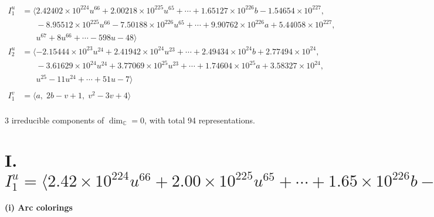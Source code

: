 \documentclass[1p]{elsarticle_modified}
\theoremstyle{definition}
\begin{document}
\begin{align*}
I^u_{1}&=\langle 
2.42402\times10^{224} u^{66}+2.00218\times10^{225} u^{65}+\cdots+1.65127\times10^{226} b-1.54654\times10^{227},\\
\phantom{I^u_{1}}&\phantom{= \langle  }-8.95512\times10^{225} u^{66}-7.50188\times10^{226} u^{65}+\cdots+9.90762\times10^{226} a+5.44058\times10^{227},\\
\phantom{I^u_{1}}&\phantom{= \langle  }u^{67}+8 u^{66}+\cdots-598 u-48\rangle \\
I^u_{2}&=\langle 
-2.15444\times10^{23} u^{24}+2.41942\times10^{24} u^{23}+\cdots+2.49434\times10^{24} b+2.77494\times10^{24},\\
\phantom{I^u_{2}}&\phantom{= \langle  }-3.61629\times10^{24} u^{24}+3.77069\times10^{25} u^{23}+\cdots+1.74604\times10^{25} a+3.58327\times10^{24},\\
\phantom{I^u_{2}}&\phantom{= \langle  }u^{25}-11 u^{24}+\cdots+51 u-7\rangle \\
\\
I^v_{1}&=\langle 
a,\;2 b- v+1,\;v^2-3 v+4\rangle \\
\end{align*}
\raggedright * 3 irreducible components of $\dim_{\mathbb{C}}=0$, with total 94 representations.\\
\newpage
\renewcommand{\arraystretch}{1}
\centering \section*{I. $I^u_{1}= \langle 2.42\times10^{224} u^{66}+2.00\times10^{225} u^{65}+\cdots+1.65\times10^{226} b-1.55\times10^{227},\;-8.96\times10^{225} u^{66}-7.50\times10^{226} u^{65}+\cdots+9.91\times10^{226} a+5.44\times10^{227},\;u^{67}+8 u^{66}+\cdots-598 u-48 \rangle$}
\flushleft \textbf{(i) Arc colorings}\\
\end{document}
